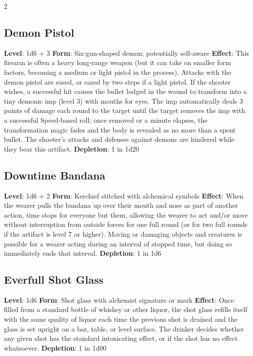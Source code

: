\begin{multicols}{2}
\subsection{Demon Pistol}
\textbf{Level}: 1d6 + 3 
\textbf{Form}: Six‑gun‑shaped demon; potentially self‑aware 
\textbf{Effect}: This firearm is often a heavy long‑range weapon (but it can take on smaller form factors, becoming a medium or light pistol in the process). Attacks with the demon pistol are eased, or eased by two steps if a light pistol. 
If the shooter wishes, a successful hit causes the bullet lodged in the wound to transform into a tiny demonic imp (level 3) with mouths for eyes. The imp automatically deals 3 points of damage each round to the target until the target removes the imp with a successful Speed‑based roll; once removed or a minute elapses, the transformation magic fades and the body is revealed as no more than a spent bullet. 
The shooter’s attacks and defenses against demons are hindered while they bear this artifact. 
\textbf{Depletion}: 1 in 1d20

\subsection{Downtime Bandana}
\textbf{Level}: 1d6 + 2 
\textbf{Form}: Kerchief stitched with alchemical symbols 
\textbf{Effect}: When the wearer pulls the bandana up over their mouth and nose as part of another action, time stops for everyone but them, allowing the wearer to act and/or move without interruption from outside forces for one full round (or for two full rounds if the artifact is level 7 or higher). Moving or damaging objects and creatures is possible for a wearer acting during an interval of stopped time, but doing so immediately ends that interval. 
\textbf{Depletion}: 1 in 1d6 

\subsection{Everfull Shot Glass }
\textbf{Level}: 1d6 
\textbf{Form}: Shot glass with alchemist signature or mark 
\textbf{Effect}: Once filled from a standard bottle of whiskey or other liquor, the shot glass refills itself with the same quality of liquor each time the previous shot is drained and the glass is set upright on a bar, table, or level surface. 
The drinker decides whether any given shot has the standard intoxicating effect, or if the shot has no effect whatsoever. 
\textbf{Depletion}: 1 in 1d00 


\end{multicols}
